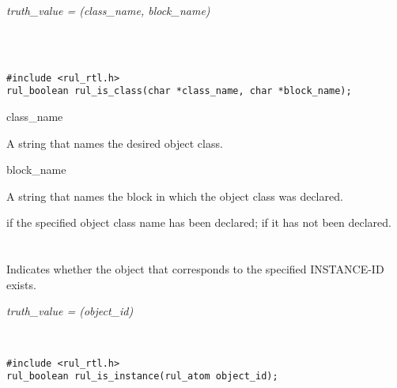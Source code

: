 \Syntax

\it{truth\_value} = (\it{class\_name},
\it{block\_name})

\begin{args}
   \\
   \\
\end{args}

\CBinding
\begin{verbatim}
#include <rul_rtl.h>
rul_boolean rul_is_class(char *class_name, char *block_name);
\end{verbatim}

\begin{arguments}
\item[class\_name]

  A string that names the desired object class.

\item[block\_name]

  A string that names the block in which the object class was
  declared.
\end{arguments}

\ReturnValue

 if the specified object class name has been declared;
 if it has not been declared.

\begin{seealso}
\end{seealso}

\section*{}

Indicates whether the object that corresponds to the specified
INSTANCE-ID exists.

\Syntax

\it{truth\_value} = (\it{object\_id})

\begin{args}
   \\
\end{args}

\CBinding
\begin{verbatim}
#include <rul_rtl.h>
rul_boolean rul_is_instance(rul_atom object_id);
\end{verbatim}

